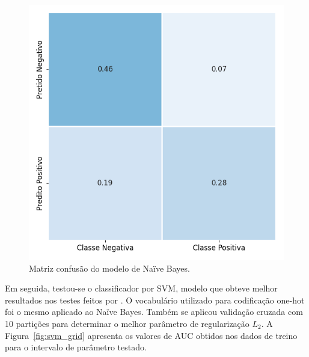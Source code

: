 \begin{figure}[h!]
\begin{center} {
    \begin{center}
    \includegraphics[scale=0.65]{images/nb_cm.png}
    \caption{Matriz confusão do modelo de Naïve Bayes.}
    \label{fig:nb_confusion}
    \end{center}
}
\end{center}
\end{figure}

Em seguida, testou-se o classificador por SVM, modelo que obteve melhor
resultados nos testes feitos por \citet{go09}.
O vocabulário utilizado para codificação one-hot foi o mesmo aplicado ao
Naïve Bayes.
Também se aplicou validação cruzada com 10 partições para determinar o melhor
parâmetro de regularização $L_2$.
A Figura~\ref{fig:svm_grid} apresenta os valores de AUC obtidos nos dados de
treino para o intervalo de parâmetro testado.

